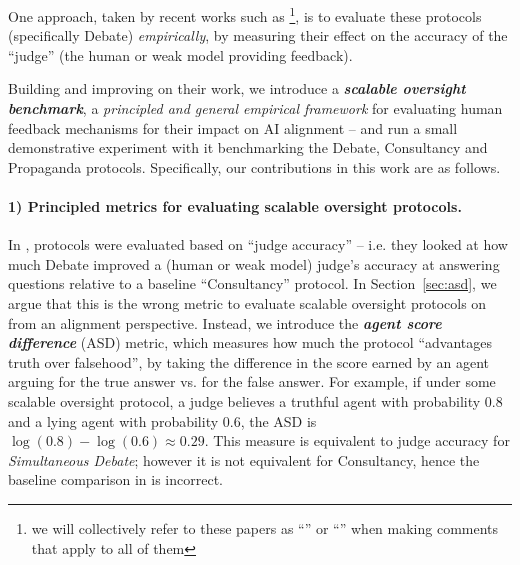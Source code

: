 One approach, taken by recent works such as \allpreviousworks\footnote{we will collectively refer to these papers as ``\previouswork{}'' or ``\previousworkalt{}'' when making comments that apply to all of them}, is to evaluate these protocols (specifically Debate) \emph{empirically}, by measuring their effect on the accuracy of the ``judge'' (the human or weak model providing feedback). %

Building and improving on their work, we introduce a \textbf{\emph{scalable oversight benchmark}}, a \emph{principled and general empirical framework} for evaluating human feedback mechanisms for their impact on AI alignment -- and run a small demonstrative experiment with it benchmarking the Debate, Consultancy and Propaganda protocols. Specifically, our contributions in this work are as follows.

\paragraph{1) Principled metrics for evaluating scalable oversight protocols.} In \previouswork{}, protocols were evaluated based on ``judge accuracy'' -- i.e. they looked at how much Debate improved a (human or weak model) judge's accuracy at answering questions relative to a baseline ``Consultancy'' protocol. In Section~\ref{sec:asd}, we argue that this is the wrong metric to evaluate scalable oversight protocols on from an alignment perspective. Instead, we introduce the \emph{\textbf{agent score difference}} (ASD) metric, which measures how much the protocol ``advantages truth over falsehood'', by taking the difference in the score earned by an agent arguing for the true answer vs. for the false answer. For example, if under some scalable oversight protocol, a judge believes a truthful agent with probability \(0.8\) and a lying agent with probability \(0.6\), the ASD is \(\log(0.8)-\log(0.6)\approx 0.29\). This measure is equivalent to judge accuracy for \emph{Simultaneous Debate}; however it is not equivalent for Consultancy, hence the baseline comparison in \previouswork{} is incorrect.

